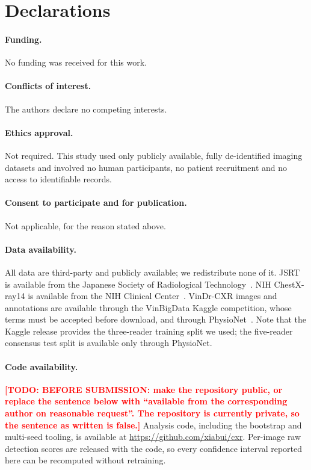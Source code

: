 \documentclass[11pt,a4paper]{article}
\newcommand{\todo}[1]{\textcolor{red}{\textbf{[TODO: #1]}}}
\begin{document}
\section*{Declarations}

\paragraph{Funding.}
No funding was received for this work.

\paragraph{Conflicts of interest.}
The authors declare no competing interests.

\paragraph{Ethics approval.}
Not required. This study used only publicly available, fully de-identified
imaging datasets and involved no human participants, no patient recruitment and
no access to identifiable records.

\paragraph{Consent to participate and for publication.}
Not applicable, for the reason stated above.

\paragraph{Data availability.}
All data are third-party and publicly available; we redistribute none of it.
JSRT is available from the Japanese Society of Radiological
Technology~\cite{shiraishi2000jsrt}. NIH ChestX-ray14 is available from the
NIH Clinical Center~\cite{wang2017chestxray}. VinDr-CXR images and annotations
are available through the VinBigData Kaggle competition, whose terms must be
accepted before download, and through PhysioNet~\cite{nguyen2022vindr}. Note
that the Kaggle release provides the three-reader training split we used; the
five-reader consensus test split is available only through PhysioNet.

\paragraph{Code availability.}
\todo{BEFORE SUBMISSION: make the repository public, or replace the sentence below with ``available from the corresponding author on reasonable request''. The repository is currently private, so the sentence as written is false.}
Analysis code, including the bootstrap and multi-seed tooling, is available at
\url{https://github.com/xiabui/cxr}. Per-image raw detection scores are released
with the code, so every confidence interval reported here can be recomputed
without retraining.
\end{document}
